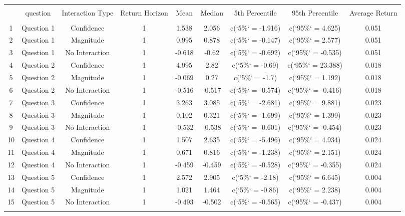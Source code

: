 
\begin{table}[!htbp] \centering 
  \caption{} 
  \label{} 
\begin{tabular}{@{\extracolsep{5pt}} ccccccccc} 
\\[-1.8ex]\hline 
\hline \\[-1.8ex] 
 & question & Interaction Type & Return Horizon & Mean & Median & 5th Percentile & 95th Percentile & Average Return \\ 
\hline \\[-1.8ex] 
1 & Question 1 & Confidence & 1 & 1.538 & 2.056 & c(`5\%` = -1.916) & c(`95\%` = 4.625) & 0.051 \\ 
2 & Question 1 & Magnitude & 1 & 0.995 & 0.878 & c(`5\%` = -0.147) & c(`95\%` = 2.577) & 0.051 \\ 
3 & Question 1 & No Interaction & 1 & -0.618 & -0.62 & c(`5\%` = -0.692) & c(`95\%` = -0.535) & 0.051 \\ 
4 & Question 2 & Confidence & 1 & 4.995 & 2.82 & c(`5\%` = -0.69) & c(`95\%` = 23.388) & 0.018 \\ 
5 & Question 2 & Magnitude & 1 & -0.069 & 0.27 & c(`5\%` = -1.7) & c(`95\%` = 1.192) & 0.018 \\ 
6 & Question 2 & No Interaction & 1 & -0.516 & -0.517 & c(`5\%` = -0.574) & c(`95\%` = -0.416) & 0.018 \\ 
7 & Question 3 & Confidence & 1 & 3.263 & 3.085 & c(`5\%` = -2.681) & c(`95\%` = 9.881) & 0.023 \\ 
8 & Question 3 & Magnitude & 1 & 0.102 & 0.321 & c(`5\%` = -1.699) & c(`95\%` = 1.399) & 0.023 \\ 
9 & Question 3 & No Interaction & 1 & -0.532 & -0.538 & c(`5\%` = -0.601) & c(`95\%` = -0.454) & 0.023 \\ 
10 & Question 4 & Confidence & 1 & 1.507 & 2.635 & c(`5\%` = -5.496) & c(`95\%` = 4.934) & 0.024 \\ 
11 & Question 4 & Magnitude & 1 & 0.671 & 0.816 & c(`5\%` = -1.238) & c(`95\%` = 2.151) & 0.024 \\ 
12 & Question 4 & No Interaction & 1 & -0.459 & -0.459 & c(`5\%` = -0.528) & c(`95\%` = -0.355) & 0.024 \\ 
13 & Question 5 & Confidence & 1 & 2.572 & 2.905 & c(`5\%` = -2.18) & c(`95\%` = 6.645) & 0.004 \\ 
14 & Question 5 & Magnitude & 1 & 1.021 & 1.464 & c(`5\%` = -0.86) & c(`95\%` = 2.238) & 0.004 \\ 
15 & Question 5 & No Interaction & 1 & -0.493 & -0.502 & c(`5\%` = -0.565) & c(`95\%` = -0.437) & 0.004 \\ 
\hline \\[-1.8ex] 
\end{tabular} 
\end{table} 
